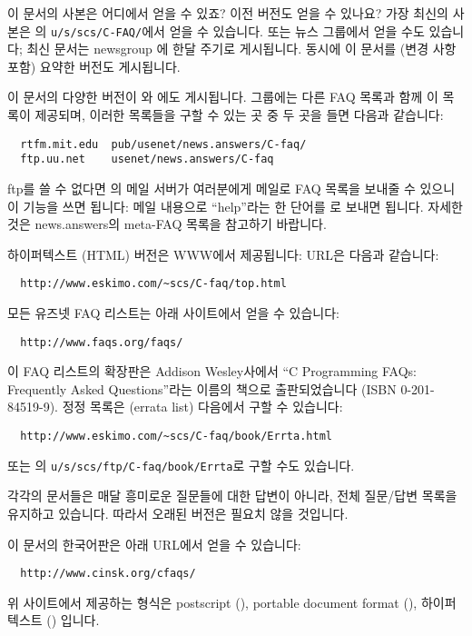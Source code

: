 \begin{faq}
	이 문서의 사본은 어디에서 얻을 수 있죠?
	이전 버전도 얻을 수 있나요?
\A
	가장 최신의 사본은 의 \verb+u/s/scs/C-FAQ/+에서
	얻을 수 있습니다.  또는 뉴스 그룹에서 얻을 수도 있습니다;
	최신 문서는 newsgroup 에 한달 주기로 게시됩니다.
	동시에 이 문서를 (변경 사항 포함) 요약한 버전도 게시됩니다.

	이 문서의 다양한 버전이 와 에도
	게시됩니다.   그룹에는 다른 FAQ 목록과 함께
	이 목록이 제공되며, 이러한 목록들을 구할 수 있는 곳 중 두 곳을
	들면 다음과 같습니다:
\begin{verbatim}
  rtfm.mit.edu  pub/usenet/news.answers/C-faq/
  ftp.uu.net    usenet/news.answers/C-faq
\end{verbatim}
	ftp를 쓸 수 없다면 의 메일 서버가 여러분에게
	메일로 FAQ 목록을 보내줄 수 있으니 이 기능을 쓰면 됩니다:
	메일 내용으로 ``help''라는 한 단어를 로
	보내면 됩니다.  자세한 것은 news.answers의 meta-FAQ 목록을
	참고하기 바랍니다.

	하이퍼텍스트 (HTML) 버전은 WWW에서 제공됩니다: URL은 다음과
	같습니다:
\begin{verbatim}
  http://www.eskimo.com/~scs/C-faq/top.html
\end{verbatim}
	\noindent 모든 유즈넷 FAQ 리스트는 아래 사이트에서 얻을 수 있습니다:
\begin{verbatim}
  http://www.faqs.org/faqs/
\end{verbatim}

	이 FAQ 리스트의 확장판은 Addison Wesley사에서 ``C Programming
	FAQs: Frequently Asked Questions''라는 이름의 책으로
	출판되었습니다 (ISBN 0-201-84519-9).  정정 목록은 (errata list)
	다음에서 구할 수 있습니다:
\begin{verbatim}
  http://www.eskimo.com/~scs/C-faq/book/Errta.html
\end{verbatim}
	\noindent 또는 의
	\verb+u/s/scs/ftp/C-faq/book/Errta+로 구할 수도 있습니다.

	각각의 문서들은 매달 흥미로운 질문들에 대한 답변이 아니라,
	전체 질문/답변 목록을 유지하고 있습니다.  따라서 오래된 버전은
	필요치 않을 것입니다.

\T
	이 문서의 한국어판은 아래 URL에서 얻을 수 있습니다:
\begin{verbatim}
  http://www.cinsk.org/cfaqs/
\end{verbatim}
	\noindent 위 사이트에서 제공하는 형식은 postscript (),
	portable document format (), 하이퍼 텍스트 ()
	입니다.
\end{faq}

%
%
